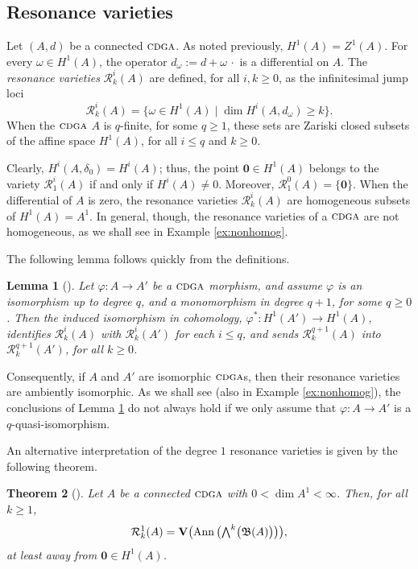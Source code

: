 \documentclass{article}
\numberwithin{equation}{section}
\newtheorem{theorem}{Theorem}[section]
\newtheorem{lemma}[theorem]{Lemma}
\theoremstyle{definition}
\newcommand{\bV}{\mathbf{V}}
\newcommand{\RR}{\mathcal{R}}
\newcommand{\fB}{\mathfrak{B}}
\newcommand{\cdga}{\ensuremath{\textsc{cdga}}}
\DeclareMathOperator{\Ann}{Ann}
\newcommand{\zero}{\mathbf{0}}
\newcommand{\bwedge}{\mbox{\normalsize $\bigwedge$}}
\begin{document}
\subsection{Resonance varieties}
\label{subsec:resvar}
Let $(A,d)$ be a connected $\cdga$.  As noted previously, $H^1(A)=Z^1(A)$. 
For every $\omega \in H^1(A)$, the operator $d_{\omega}:= d+ \omega \, \cdot$ 
is a differential on $A$. The {\em resonance varieties}\/ $\RR^i_k(A)$
are defined, for all $i,k\ge 0$, as the infinitesimal jump loci
%
\begin{equation}
\label{eq:defres}
\RR^i_k(A) =\{ \omega \in H^1(A) \mid 
\dim H^i(A, d_{\omega} )\ge k\} .
\end{equation}
When the $\cdga$ $A$ is $q$-finite, for some $q\ge 1$, these sets 
are Zariski closed subsets of the affine space $H^1(A)$, for all 
$i\le q$ and $k\ge 0$. 

Clearly, $H^i(A, \delta_{0})=H^i(A)$; thus, the point 
$\zero\in H^1(A)$ belongs to the variety $\RR^i_1(A)$ 
if and only if $H^i(A)\ne 0$.  Moreover, $\RR^0_1(A)=\{\zero\}$.  
When the differential of $A$ is zero, the resonance varieties 
$\RR^i_k(A)$ are homogeneous subsets of $H^1(A)=A^1$. 
In general, though, the resonance varieties of a $\cdga$ 
are not homogeneous, as we shall see in Example \ref{ex:nonhomog}.

The following lemma follows quickly from the definitions. 

\begin{lemma}[\cite{MPPS}] 
\label{lem:functoriality}
Let $\varphi\colon A\to A'$ be a $\cdga$ morphism, 
and assume $\varphi$ is an isomorphism up to degree $q$, 
and a monomorphism in degree $q+1$, for some $q\ge 0$.  
Then the induced isomorphism in cohomology, 
$\varphi^*\colon H^1(A')\to H^1(A)$, identifies 
$\RR^i_k(A)$ with $\RR^i_k(A')$ for each $i\le q$,
and sends $\RR^{q+1}_k(A)$ into $\RR^{q+1}_k(A')$, 
for all $k\ge 0$. 
\end{lemma}

Consequently, if $A$ and $A'$ are isomorphic $\cdga$s, then their 
resonance varieties are ambiently isomorphic.  As we shall see  
(also in Example \ref{ex:nonhomog}), the conclusions of 
Lemma \ref{lem:functoriality} do not always hold if we only 
assume that $\varphi\colon A\to A'$ is a $q$-quasi-isomorphism.

An alternative interpretation of the degree $1$ resonance varieties is 
given by the following theorem.

\begin{theorem}[\cite{Su-cdga}]
\label{theorem:r1a}
Let $A$ be a connected $\cdga$ with $0<\dim A^1<\infty$.  Then, 
for all $k\ge 1$,
\begin{equation}
\label{eq:res-inv}
\RR^1_k(A) = 
\bV \big( \!\Ann\big(\bwedge^k \big(\fB(A)\big)\big)\big),
\end{equation}
at least away from $\zero\in H^1(A)$.
\end{theorem}
\end{document}
